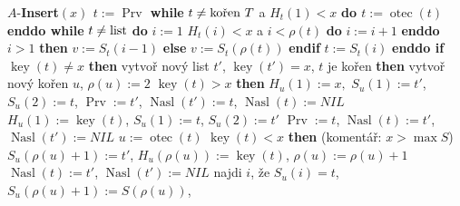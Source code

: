 \documentclass[a4paper,12pt]{article}
\DeclareMathOperator*{\otec}{otec}
\DeclareMathOperator*{\Prv}{Prv}
\DeclareMathOperator*{\Nasl}{Nasl}
\DeclareMathOperator*{\key}{key}
\begin{document}
$A$-{\bf Insert$(x)$\newline 
$t:=\Prv$\newline
while} $t\ne\text{\rm ko\v ren }T$ a $H_t(1)<x$ {\bf do $t:=\otec(t)$ enddo\newline 
while} $t\ne\text{\rm list}$ {\bf do}\newline 
\phantom{---}$i:=1$\newline 
\phantom{---}{\bf while} $H_t(i)<x$ a $i<\rho (t)$ {\bf do} $i:=i+1$ {\bf enddo}\newline 
\phantom{---}{\bf if} $i>1$ {\bf then} $v:=S_t(i-1)$ {\bf else} $v:=S_t(\rho (t))$ {\bf endif}\newline 
\phantom{---}$t:=S_t(i)$\newline 
{\bf enddo\newline 
if} $\key(t)\ne x$ {\bf then\newline }
\phantom{---}vytvo\v r nov\'y list $t'$, $\key(t')=x$,\newline
\phantom{---}{\bf if} $t$ je ko\v ren {\bf then}\newline 
\phantom{------}vytvo\v r nov\'y ko\v ren $u$, $\rho (u):=2$\newline 
\phantom{------}{\bf if} $\key(t)>x$ {\bf then}\newline 
\phantom{---------}$H_u(1):=x,$ $S_u(1):=t'$, $S_u(2):=t$,\newline
\phantom{---------}$\Prv:=t'$, $\Nasl(t'):=t$, $\Nasl(t):=NIL$\newline 
\phantom{------}{\bf else}\newline 
\phantom{---------}$H_u(1):=\key(t)$, $S_u(1):=t$, $S_u(2):=t'$\newline
\phantom{---------}$\Prv:=t$, $\Nasl(t):=t'$, $\Nasl(t'):=NIL$\newline 
\phantom{------}{\bf endif}\newline 
\phantom{---}{\bf else}\newline 
\phantom{------}$u:=\otec(t)$\newline 
\phantom{------}{\bf if} $\key(t)<x$ {\bf then}\newline  
(koment\'a\v r: $x>\max S$)\newline 
\phantom{---------}$S_u(\rho (u)+1):=t'$, $H_u(\rho(u)):=\key(t)$, $\rho(u):=\rho(u)+1$\newline 
\phantom{---------}$\Nasl(t):=t'$, $\Nasl(t'):=NIL$\newline 
\phantom{------}{\bf else}\newline 
\phantom{---------}najdi $i$, \v ze $S_u(i)=t$, $S_u(\rho(u)+1):=S(\rho(u))$,\newline 
\end{document}
